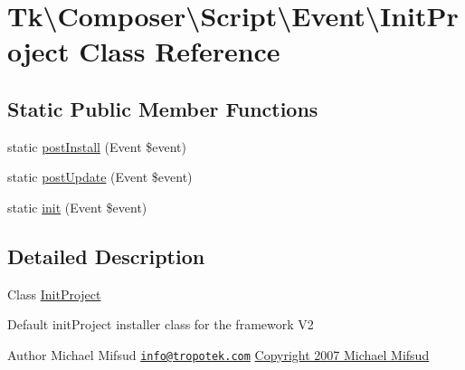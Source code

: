 \hypertarget{classTk_1_1Composer_1_1Script_1_1Event_1_1InitProject}{\section{Tk\textbackslash{}Composer\textbackslash{}Script\textbackslash{}Event\textbackslash{}Init\+Project Class Reference}
\label{classTk_1_1Composer_1_1Script_1_1Event_1_1InitProject}
}
\subsection*{Static Public Member Functions}
\begin{DoxyCompactItemize}
\item 
static \hyperlink{classTk_1_1Composer_1_1Script_1_1Event_1_1InitProject_acd00c2e59dbe837096c4c456e4e95982}{post\+Install} (Event \$event)
\item 
static \hyperlink{classTk_1_1Composer_1_1Script_1_1Event_1_1InitProject_a47c5fd63d49d586f731f80ba6c22ee0a}{post\+Update} (Event \$event)
\item 
static \hyperlink{classTk_1_1Composer_1_1Script_1_1Event_1_1InitProject_ae1669776278466460408f59bfa35c483}{init} (Event \$event)
\end{DoxyCompactItemize}


\subsection{Detailed Description}
Class \hyperlink{classTk_1_1Composer_1_1Script_1_1Event_1_1InitProject}{Init\+Project}

Default init\+Project installer class for the framework V2

\begin{DoxyAuthor}{Author}
Michael Mifsud \href{mailto:info@tropotek.com}{\tt info@tropotek.\+com} \hyperlink{}{Copyright 2007 Michael Mifsud }
\end{DoxyAuthor}


